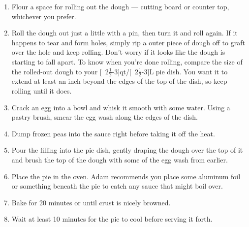 \documentclass{book}
\begin{document}
\begin{recipe}
{\begin{enumerate}
				and pepper to taste. The sauce should ultimately taste a little
				too salty, as it doesn't need to stand on its own.
			\item Flour a space for rolling out the dough --- cutting board or
				counter top, whichever you prefer.
			\item Roll the dough out just a little with a pin, then turn it and
				roll again. If it happens to tear and form holes, simply rip a
				outer piece of dough off to graft over the hole and keep
				rolling. Don't worry if it looks like the dough is starting to
				fall apart. To know when you're done rolling, compare the size
				of the rolled-out dough to your
				\unit[2$\frac{1}{2}$-3]{qt}/\unit[2$\frac{1}{2}$-3]{L} pie dish.
				You want it to extend at least an inch beyond the edges of the
				top of the dish, so keep rolling until it does.
			\item Crack an egg into a bowl and whisk it smooth with some water.
				Using a pastry brush, smear the egg wash along the edges of the
				dish.
			\item Dump frozen peas into the sauce right before taking it off the
				heat.
			\item Pour the filling into the pie dish, gently draping the dough
				over the top of it and brush the top of the dough with some of
				the egg wash from earlier.
			\item Place the pie in the oven. Adam recommends you place some
				aluminum foil or something beneath the pie to catch any sauce
				that might boil over.
			\item Bake for 20 minutes or until crust is nicely browned.
			\item Wait at least 10 minutes for the pie to cool before serving it
				forth.
		\end{enumerate}
	}
\end{recipe}
\end{document}
